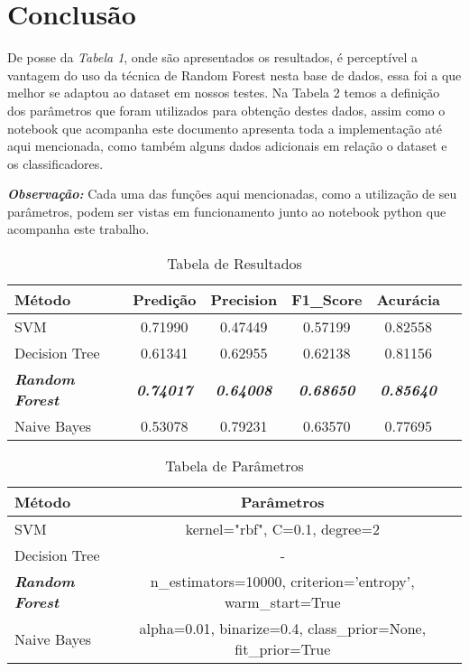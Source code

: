 \documentclass[
	12pt,				    %
	openright,			    %
	oneside,			    %
	a4paper,			    %
    sumario=tradicional,    %
	english,			    %
	brazil,				    %
	]{abntex2}
\begin{document}
\chapter{Conclusão}\label{sec:conclusão}
De posse da \textit{Tabela 1}, onde são apresentados os resultados, é perceptível a vantagem do uso da técnica de Random Forest nesta base de dados, essa foi a que melhor se adaptou ao dataset em nossos testes. Na Tabela 2 temos a definição dos parâmetros que foram utilizados para obtenção destes dados, assim como o notebook que acompanha este documento apresenta toda a implementação até aqui mencionada, como também alguns dados adicionais em relação o dataset e os classificadores.

\textbf{\textit{Observação:}} Cada uma das funções aqui mencionadas, como a utilização de seu parâmetros, podem ser vistas em funcionamento junto ao notebook python que acompanha este trabalho.

\begin{table}[htbp]
  \centering
    \caption[Tabela de Resultados]{Tabela de Resultados}
    \label{tab:resultados}
    \begin{tabular}{lccccc} %
    \toprule
    \textbf{Método} & \textbf{Predição} & \textbf{Precision} & \textbf{F1\_Score} & \textbf{Acurácia} \\
    \midrule
        SVM & 0.71990 & 0.47449 & 0.57199 & 0.82558 \\
        Decision Tree & 0.61341 & 0.62955 & 0.62138 & 0.81156 \\
        \textit{\textbf{Random Forest}} & \textit{\textbf{0.74017}} & \textit{\textbf{0.64008}} & \textbf{\textit{0.68650}} & \textbf{\textit{0.85640}} \\
        Naive Bayes & 0.53078 & 0.79231 & 0.63570 & 0.77695 \\
    \bottomrule
    \end{tabular}%
\end{table}%

\begin{table}[htbp]
  \centering
    \caption[Tabela de Parâmetros]{Tabela de Parâmetros}
    \label{tab:parametros}
    \begin{tabular}{lcc} %
    \toprule
    \textbf{Método} & \textbf{Parâmetros} \\
    \midrule
        SVM & kernel="rbf", C=0.1, degree=2 \\
        Decision Tree & \-- \\
        \textit{\textbf{Random Forest}} & n\_estimators=10000, criterion='entropy', warm\_start=True \\
        Naive Bayes & alpha=0.01, binarize=0.4, class\_prior=None, fit\_prior=True \\
    \bottomrule
    \end{tabular}%
\end{table}%
\end{document}
